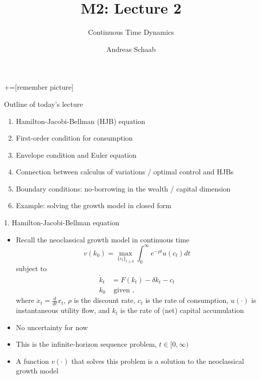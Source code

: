 \documentclass[10pt]{beamer}
\title{\large M2: Lecture 2}
\subtitle{Continuous Time Dynamics}
\author{Andreas Schaab}
\date{}
\begin{document}
+=[remember picture]
\thispagestyle{empty}
\maketitle 
\newpage

\addtocounter{framenumber}{-1}




\begin{frame}{Outline of today's lecture}
\addtocounter{framenumber}{-1}

\begin{enumerate}
\item Hamilton-Jacobi-Bellman (HJB) equation
\item First-order condition for consumption 
\item Envelope condition and Euler equation
\item Connection between calculus of variations / optimal control and HJBs
\item Boundary conditions: no-borrowing in the wealth / capital dimension
\item Example: solving the growth model in closed form 
\end{enumerate}
\end{frame}



\begin{frame}{1. Hamilton-Jacobi-Bellman equation}
\begin{itemize}
\item Recall the neoclassical growth model in continuous time
\begin{equation*}
	v(k_0) = \max_{\{ c_t \}_{t \geq 0} } \int_0^\infty e^{-\rho t} u(c_t) dt
\end{equation*}
subject to
\begin{align*}
	\dot k_t &= F(k_t) - \delta k_t - c_t \\
	k_0 &\text{ given },
\end{align*}
where $\dot x_t = \frac{d}{dt} x_t$, $\rho$ is the discount rate, $c_t$ is the rate of consumption, $u(\cdot)$ is instantaneous utility flow, and $\dot k_t$ is the rate of (net) capital accumulation

\item No uncertainty for now %

\item This is the infinite-horizon sequence problem, $t \in [0, \infty)$

\item A function $v(\cdot)$ that solves this problem is a solution to the neoclassical growth model 
\end{itemize}
\end{frame}
\end{document}
